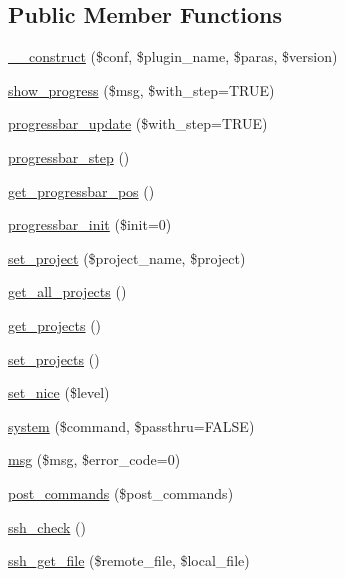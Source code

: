 \subsection*{Public Member Functions}
\begin{DoxyCompactItemize}
\item 
\hyperlink{class_sldeploy_ab0bebdee3aac24a983f6a88c07aecf76}{\_\-\_\-construct} (\$conf, \$plugin\_\-name, \$paras, \$version)
\item 
\hyperlink{class_sldeploy_a644c8fdb9d886050e2e228fb3127f567}{show\_\-progress} (\$msg, \$with\_\-step=TRUE)
\item 
\hyperlink{class_sldeploy_a2316dc6f8ea2e9715cb258fd86857ccc}{progressbar\_\-update} (\$with\_\-step=TRUE)
\item 
\hyperlink{class_sldeploy_a009a2dc0fc814d827457eec10b76c398}{progressbar\_\-step} ()
\item 
\hyperlink{class_sldeploy_a98577db0f72ad6b6b4f1286761bcc243}{get\_\-progressbar\_\-pos} ()
\item 
\hyperlink{class_sldeploy_ab8a708b4554e8cc14355a1ce8e7e61b4}{progressbar\_\-init} (\$init=0)
\item 
\hyperlink{class_sldeploy_a428efd510eae25311c07442072ff8956}{set\_\-project} (\$project\_\-name, \$project)
\item 
\hyperlink{class_sldeploy_acf6093ed82132d7cbcf689a23d8a8cf2}{get\_\-all\_\-projects} ()
\item 
\hyperlink{class_sldeploy_a8430e36a0da117fa0dbf865f024127a3}{get\_\-projects} ()
\item 
\hyperlink{class_sldeploy_a6783d304144e744f827f42db88ae6b20}{set\_\-projects} ()
\item 
\hyperlink{class_sldeploy_a5fd893253840f623be6d141bfd3b880f}{set\_\-nice} (\$level)
\item 
\hyperlink{class_sldeploy_a7a29394a5c49356fe0e53a9150813186}{system} (\$command, \$passthru=FALSE)
\item 
\hyperlink{class_sldeploy_ab125a718f83e7a41c5ab09d0fa9146a5}{msg} (\$msg, \$error\_\-code=0)
\item 
\hyperlink{class_sldeploy_a725c114f690cecb9c5e07044fb7daa63}{post\_\-commands} (\$post\_\-commands)
\item 
\hyperlink{class_sldeploy_ab86d69acf6b7804b417c085e6b815f6f}{ssh\_\-check} ()
\item 
\hyperlink{class_sldeploy_a61701a328aa2b1deab91d83dc6ddb196}{ssh\_\-get\_\-file} (\$remote\_\-file, \$local\_\-file)
\item 

\end{DoxyCompactItemize}
